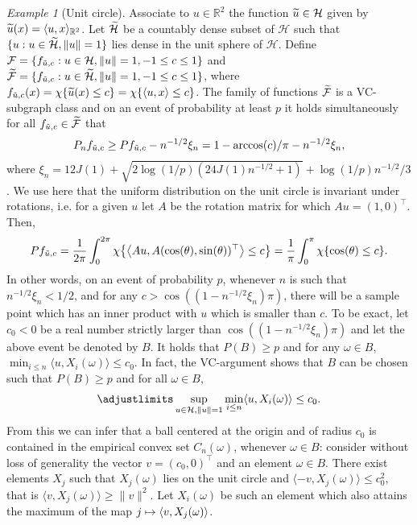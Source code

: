 \documentclass[10pt]{amsart}
\theoremstyle{definition}\newtheorem{defi}[theo]{Definition}\newtheorem{rema}[theo]{Remark}\newtheorem{exam}[theo]{Example}\newtheorem{exem}[theo]{Example}\newtheorem{nota}[theo]{Notation}
\theoremstyle{remark}
\newtheorem{examl}{Example}
\newcommand{\R}{\mathbb{R}}
\newcommand{\cH}{\mathcal{H}}
\newcommand{\clF}{\mathcal{F}}
\let\oldtilde\tilde
\renewcommand*{\tilde}[1]{\mathchoice{\widetilde{#1}}{\widetilde{#1}}{\oldtilde{#1}}{\oldtilde{#1}}}
\let\oldmapsto\mapsto
\renewcommand*{\mapsto}{\mathchoice{\longmapsto}{\oldmapsto}{\oldmapsto}{\oldmapsto}}
\let\originalleft\left
\let\originalright\right
\renewcommand{\left}{\mathopen{}\mathclose\bgroup\originalleft}
\renewcommand{\right}{\aftergroup\egroup\originalright}
\begin{document}
\begin{examl}[{Unit circle}]
Associate to $u \in \R^2$ the function $\tilde u \in \cH$ given by $\tilde u(x) = \langle u, x \rangle_{\R^2}$. Let $\tilde \cH$ be a countably dense subset of $\cH$ such that $\{u : u\in \tilde \cH, \|u\|=1\}$ lies dense in the unit sphere of $\cH$. Define $\clF = \{f_{\tilde u,c} : u \in \cH, \|u\|=1, -1 \leq c \leq 1 \}$ and $\tilde{\clF} = \{f_{\tilde u,c} : u \in \tilde{\cH},\linebreak \|u\|=1, -1 \leq c \leq 1 \}$, where $f_{\tilde u,c}(x) = \chi\{ \tilde u(x) \leq c\} = \chi\{\langle u, x\rangle \leq c\}$. The family of functions $\tilde{\clF}$ is a VC-subgraph class and on an event of probability at least $p$ it holds simultaneously for all $f_{\tilde u,c} \in \tilde{\clF}$ that
\begin{align*}
P_n f_{\tilde u,c} \geq P f_{\tilde u,c} - n^{-1/2} \xi_n = 1- \arccos(c)/\pi - n^{-1/2} \xi_n,
\end{align*}
where $\xi_n = 12 J(1) + \sqrt{2 \log(1/p) (24 J(1) n^{-1/2} + 1)} + \log(1/p)n^{-1/2}/3$. We use here that the uniform distribution on the unit circle is invariant under rotations, i.e. for a given $u$ let $A$ be the rotation matrix for which $Au = (1, 0)^\top$. Then,
\[
P f_{\tilde u,c} = \frac{1}{2\pi} \int_0^{2\pi} \chi\left\{\left\langle A u, A (\cos(\theta),\sin(\theta))^\top \right\rangle \leq c \right\} = \frac{1}{\pi} \int_0^{\pi} \chi\{\cos(\theta) \leq c \}.
\]
In other words, on an event of probability $p$, whenever $n$ is such that $n^{-1/2} \xi_n <1/2$, and for any $c > \cos((1-n^{-1/2}\xi_n) \pi)$, there will be a sample point which has an inner product with $u$ which is smaller than $c$. To be exact, let $c_0 < 0$ be a real number strictly larger than $\cos((1-n^{-1/2}\xi_n) \pi)$ and let the above event be denoted by $B$. It holds that $P(B) \geq p$ and for any $\omega \in B$, $\min_{i\leq n} \langle u, X_i(\omega) \rangle \leq c_0$. In fact, the VC-argument shows that $B$ can be chosen such that $P(B)\geq p$ and for all $\omega \in B$,
\[
\adjustlimits\sup_{u \in \cH, \|u\|=1} \min_{i\leq n} \langle u, X_i(\omega) \rangle \leq c_0.
\]
From this we can infer that a ball centered at the origin and of radius $c_0$ is contained in the empirical convex set $C_n(\omega)$, whenever $\omega \in B$: consider without loss of generality the vector $v= (c_0, 0)^\top$ and an element $\omega \in B$. There exist elements $X_j$ such that $X_j(\omega)$ lies on the unit circle and $\langle - v, X_j(\omega) \rangle \leq c_0^2$, that is $\langle v, X_j(\omega) \rangle \geq \|v\|^2$. Let $X_i(\omega)$ be such an element which also attains the maximum of the map $j \mapsto \langle v,X_j(\omega) \rangle$.


\end{examl}
\end{document}
